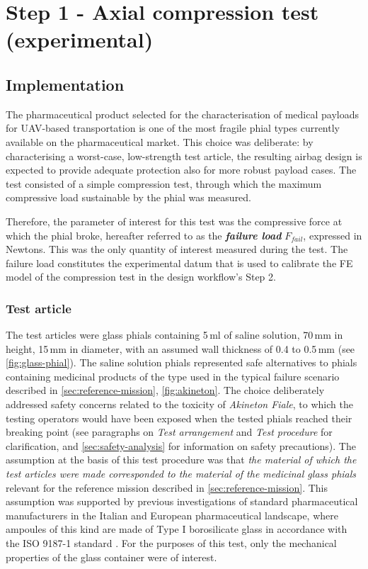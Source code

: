 \section{Step 1 - Axial compression test (experimental)}\label{section:step1-test}
\subsection{Implementation}
The pharmaceutical product selected for the characterisation of medical payloads for UAV-based transportation is one of the most fragile phial types currently available on the pharmaceutical market. This choice was deliberate: by characterising a worst-case, low-strength test article, the resulting airbag design is expected to provide adequate protection also for more robust payload cases. The test consisted of a simple compression test, through which the maximum compressive load sustainable by the phial was measured.

Therefore, the parameter of interest for this test was the compressive force at which the phial broke, hereafter referred to as the \textbf{\textit{failure load}} $F_{fail}$, expressed in Newtons. This was the only quantity of interest measured during the test. The failure load constitutes the experimental datum that is used to calibrate the FE model of the compression test in the design workflow's Step 2.


\subsubsection{Test article}
The test articles were glass phials containing 5\,ml of saline solution, 70\,mm in height, 15\,mm in diameter, with an assumed wall thickness of 0.4 to 0.5\,mm (see \cref{fig:glass-phial}). The saline solution phials represented safe alternatives to phials containing medicinal products of the type used in the typical failure scenario described in \cref{sec:reference-mission}, \cref{fig:akineton}. The choice deliberately addressed safety concerns related to the toxicity of \textit{Akineton Fiale}, to which the testing operators would have been exposed when the tested phials reached their breaking point (see paragraphs on \textit{Test arrangement} and \textit{Test procedure} for clarification, and \cref{sec:safety-analysis} for information on safety precautions). The assumption at the basis of this test procedure was that \textit{the material of which the test articles were made corresponded to the material of the medicinal glass phials} relevant for the reference mission described in \cref{sec:reference-mission}. This assumption was supported by previous investigations of standard pharmaceutical manufacturers in the Italian and European pharmaceutical landscape, where ampoules of this kind are made of Type I borosilicate glass in accordance with the ISO 9187-1 standard \cite{schott2026ampoules}. For the purposes of this test, only the mechanical properties of the glass container were of interest.

